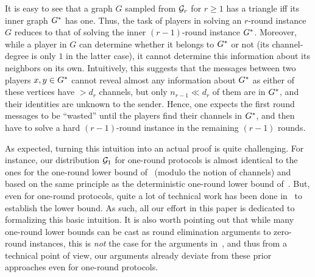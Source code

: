 \documentclass[11pt]{article}
\theoremstyle{definition}
\renewcommand{\geq}{\geqslant}
\begin{document}
It is easy to see that a graph $G$ sampled from $\mathcal{G}_r$ for $r \geq 1$ has a triangle iff its inner graph $G^*$ has one. Thus, the task of players in solving an $r$-round instance $G$
reduces to that of solving the inner $(r-1)$-round instance $G^*$. Moreover, while a player in $G$ can determine whether it belongs to $G^*$ or not (its channel-degree is only $1$ in the latter case), 
it cannot determine this information about its neighbors on its own. Intuitively, this suggests that the messages between two players $x,y \in G^*$ cannot reveal almost any information
about $G^*$ as either of these vertices have $> d_r$ channels, but only $n_{r-1} \ll d_r$ of them are in $G^*$, and their identities are unknown to the sender. Hence, one expects the first
round messages to be ``wasted'' until the players find their channels in $G^*$, and then have to solve a hard $(r-1)$-round instance in the remaining $(r-1)$ rounds. 

As expected, turning this intuition into an actual proof is quite challenging. For instance, our distribution $\mathcal{G}_1$ for one-round protocols is almost identical to the ones for the one-round lower
bound of~\cite{FischerGKO18} (modulo the notion of channels) and based on the same principle as the deterministic one-round lower bound of~\cite{AbboudCKL20}.  But, even for one-round protocols, quite a lot of technical work has been done in~\cite{FischerGKO18,AbboudCKL20}
to establish the lower bound. As such, all our effort in this paper is dedicated to formalizing this basic intuition. It is also worth pointing out that while many one-round lower bounds can be cast as round elimination arguments to zero-round instances, this 
is \emph{not} the case for the arguments in~\cite{FischerGKO18,AbboudCKL20}, and thus from a technical point of view, our arguments already deviate from these prior approaches even for one-round protocols. 
\end{document}
